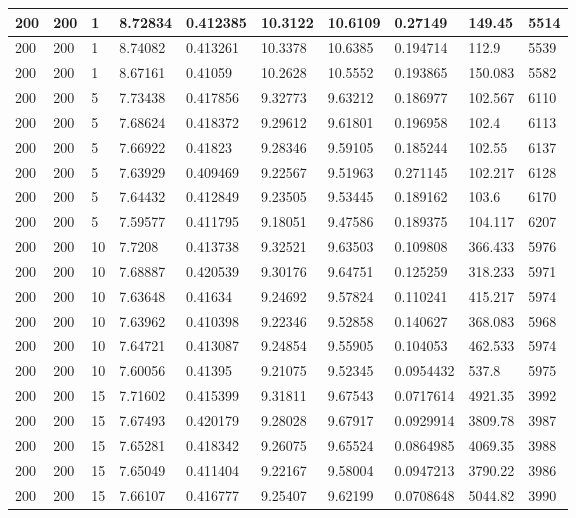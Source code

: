\begin{landscape}
\begin{longtable}{ | l | l | l | l | l | l | l | l | l | l | }
200 & 200 & 1 & 8.72834 & 0.412385 & 10.3122 & 10.6109 & 0.27149 & 149.45 & 5514\\ \hline
200 & 200 & 1 & 8.74082 & 0.413261 & 10.3378 & 10.6385 & 0.194714 & 112.9 & 5539\\ \hline
200 & 200 & 1 & 8.67161 & 0.41059 & 10.2628 & 10.5552 & 0.193865 & 150.083 & 5582\\ \hline
200 & 200 & 5 & 7.73438 & 0.417856 & 9.32773 & 9.63212 & 0.186977 & 102.567 & 6110\\ \hline
200 & 200 & 5 & 7.68624 & 0.418372 & 9.29612 & 9.61801 & 0.196958 & 102.4 & 6113\\ \hline
200 & 200 & 5 & 7.66922 & 0.41823 & 9.28346 & 9.59105 & 0.185244 & 102.55 & 6137\\ \hline
200 & 200 & 5 & 7.63929 & 0.409469 & 9.22567 & 9.51963 & 0.271145 & 102.217 & 6128\\ \hline
200 & 200 & 5 & 7.64432 & 0.412849 & 9.23505 & 9.53445 & 0.189162 & 103.6 & 6170\\ \hline
200 & 200 & 5 & 7.59577 & 0.411795 & 9.18051 & 9.47586 & 0.189375 & 104.117 & 6207\\ \hline
200 & 200 & 10 & 7.7208 & 0.413738 & 9.32521 & 9.63503 & 0.109808 & 366.433 & 5976\\ \hline
200 & 200 & 10 & 7.68887 & 0.420539 & 9.30176 & 9.64751 & 0.125259 & 318.233 & 5971\\ \hline
200 & 200 & 10 & 7.63648 & 0.41634 & 9.24692 & 9.57824 & 0.110241 & 415.217 & 5974\\ \hline
200 & 200 & 10 & 7.63962 & 0.410398 & 9.22346 & 9.52858 & 0.140627 & 368.083 & 5968\\ \hline
200 & 200 & 10 & 7.64721 & 0.413087 & 9.24854 & 9.55905 & 0.104053 & 462.533 & 5974\\ \hline
200 & 200 & 10 & 7.60056 & 0.41395 & 9.21075 & 9.52345 & 0.0954432 & 537.8 & 5975\\ \hline
200 & 200 & 15 & 7.71602 & 0.415399 & 9.31811 & 9.67543 & 0.0717614 & 4921.35 & 3992\\ \hline
200 & 200 & 15 & 7.67493 & 0.420179 & 9.28028 & 9.67917 & 0.0929914 & 3809.78 & 3987\\ \hline
200 & 200 & 15 & 7.65281 & 0.418342 & 9.26075 & 9.65524 & 0.0864985 & 4069.35 & 3988\\ \hline
200 & 200 & 15 & 7.65049 & 0.411404 & 9.22167 & 9.58004 & 0.0947213 & 3790.22 & 3986\\ \hline
200 & 200 & 15 & 7.66107 & 0.416777 & 9.25407 & 9.62199 & 0.0708648 & 5044.82 & 3990\\ \hline

\end{longtable}
\end{landscape}
